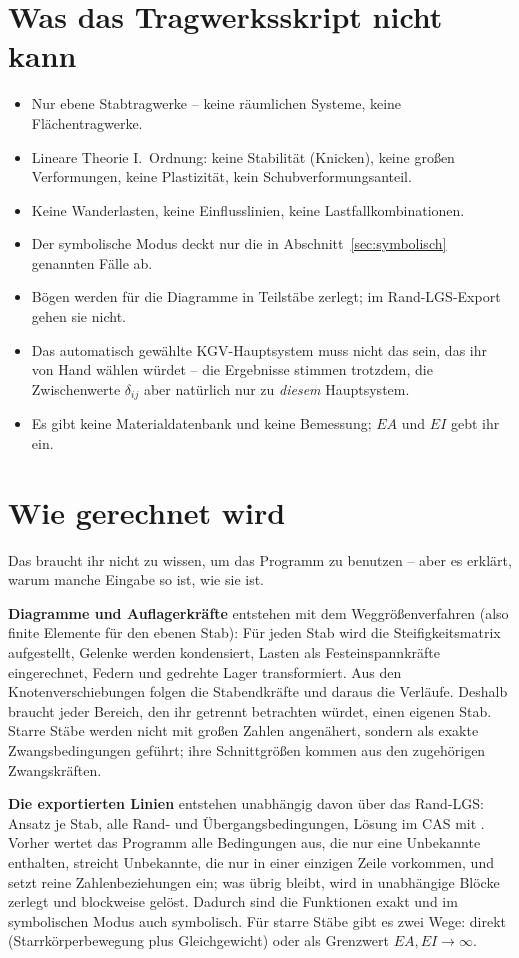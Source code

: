 \section{Was das Tragwerksskript nicht kann}

\begin{itemize}
  \item Nur ebene Stabtragwerke -- keine räumlichen Systeme, keine Flächentragwerke.
  \item Lineare Theorie I.~Ordnung: keine Stabilität (Knicken), keine großen Verformungen, keine
        Plastizität, kein Schubverformungsanteil.
  \item Keine Wanderlasten, keine Einflusslinien, keine Lastfallkombinationen.
  \item Der symbolische Modus deckt nur die in Abschnitt~\ref{sec:symbolisch} genannten Fälle ab.
  \item Bögen werden für die Diagramme in Teilstäbe zerlegt; im Rand-LGS-Export gehen sie nicht.
  \item Das automatisch gewählte KGV-Hauptsystem muss nicht das sein, das ihr von Hand wählen
        würdet -- die Ergebnisse stimmen trotzdem, die Zwischenwerte $\delta_{ij}$ aber natürlich
        nur zu \emph{diesem} Hauptsystem.
  \item Es gibt keine Materialdatenbank und keine Bemessung; $EA$ und $EI$ gebt ihr ein.
\end{itemize}

\section{Wie gerechnet wird}

Das braucht ihr nicht zu wissen, um das Programm zu benutzen -- aber es erklärt, warum manche
Eingabe so ist, wie sie ist.

\textbf{Diagramme und Auflagerkräfte} entstehen mit dem Weggrößenverfahren (also finite Elemente
für den ebenen Stab): Für jeden Stab wird die Steifigkeitsmatrix aufgestellt, Gelenke werden
kondensiert, Lasten als Festeinspannkräfte eingerechnet, Federn und gedrehte Lager transformiert.
Aus den Knotenverschiebungen folgen die Stabendkräfte und daraus die Verläufe. Deshalb braucht
jeder Bereich, den ihr getrennt betrachten würdet, einen eigenen Stab. Starre Stäbe werden nicht
mit großen Zahlen angenähert, sondern als exakte Zwangsbedingungen geführt; ihre Schnittgrößen
kommen aus den zugehörigen Zwangskräften.

\textbf{Die exportierten Linien} entstehen unabhängig davon über das Rand-LGS: Ansatz je Stab,
alle Rand- und Übergangsbedingungen, Lösung im CAS mit . Vorher wertet das Programm
alle Bedingungen aus, die nur eine Unbekannte enthalten, streicht Unbekannte, die nur in einer
einzigen Zeile vorkommen, und setzt reine Zahlenbeziehungen ein; was übrig bleibt, wird in
unabhängige Blöcke zerlegt und blockweise gelöst. Dadurch sind die Funktionen exakt und im
symbolischen Modus auch symbolisch. Für starre Stäbe gibt es zwei Wege: direkt
(Starrkörperbewegung plus Gleichgewicht) oder als Grenzwert $EA, EI \to \infty$.

